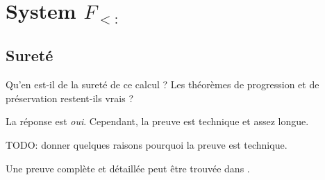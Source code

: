 \chapter{System $F_{<:}$}

\section{Sureté}

Qu'en est-il de la sureté de ce calcul ? Les théorèmes de progression et de
préservation restent-ils vrais ?

La réponse est \textit{oui}. Cependant, la preuve est technique et assez longue.

TODO: donner quelques raisons pourquoi la preuve est technique.

Une preuve complète et détaillée peut être trouvée dans \cite{tapl-bounded-quantification-metatheory}.